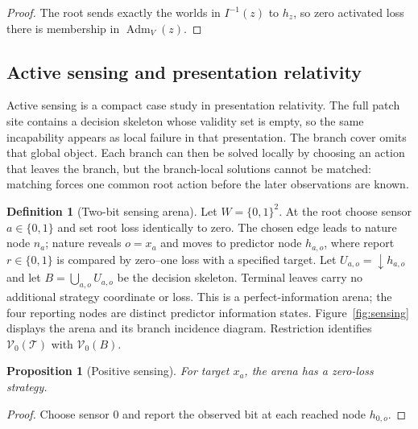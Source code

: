 \documentclass[11pt]{article}
\theoremstyle{plain}
\newtheorem{proposition}[theorem]{Proposition}
\theoremstyle{definition}
\newtheorem{definition}[theorem]{Definition}
\theoremstyle{remark}
\newcommand{\Adm}{\operatorname{Adm}}
\begin{document}
\begin{proof}
The root sends exactly the worlds in $I^{-1}(z)$ to $h_z$, so zero activated
loss there is membership in $\Adm_V(z)$.
\end{proof}

\subsection{Active sensing and presentation relativity}

Active sensing is a compact case study in presentation relativity. The full
patch site contains a decision skeleton whose validity set is empty, so the same
incapability appears as local failure in that presentation. The branch cover
omits that global object. Each branch can then be solved locally by choosing an
action that leaves the branch, but the branch-local solutions cannot be matched:
matching forces one common root action before the later observations are known.

\begin{definition}[Two-bit sensing arena]\label{def:sensing}
Let $W=\{0,1\}^2$. At the root choose sensor $a\in\{0,1\}$ and set root loss
identically to zero. The chosen edge leads to nature node $n_a$; nature reveals
$o=x_a$ and moves to predictor node
$h_{a,o}$, where report $r\in\{0,1\}$ is compared by zero--one loss with a
specified target. Let
$U_{a,o}=\downarrow h_{a,o}$ and let
$B=\bigcup_{a,o}U_{a,o}$ be the decision skeleton. Terminal leaves carry no
additional strategy coordinate or loss. This is a perfect-information arena; the
four reporting nodes are distinct predictor information states. Figure~\ref{fig:sensing} displays the arena and its branch incidence diagram. Restriction identifies
$\mathscr V_0(\mathcal T)$ with $\mathscr V_0(B)$.
\end{definition}

\begin{proposition}[Positive sensing]\label{prop:sensing-positive}
For target $x_a$, the arena has a zero-loss strategy.
\end{proposition}

\begin{proof}
Choose sensor $0$ and report the observed bit at each reached node $h_{0,o}$.
\end{proof}
\end{document}
